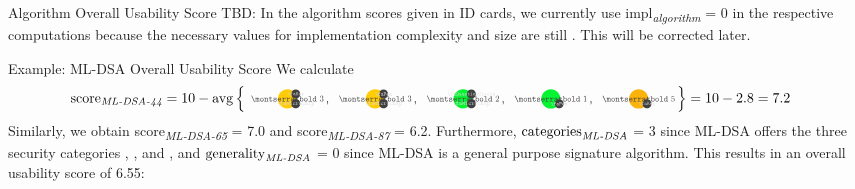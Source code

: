 \begin{algorithmbox}{Algorithm Overall Usability Score}
	\textcolor{themeaccentsecondary}{TBD: In the algorithm scores given in ID cards, we currently use \textnormal{impl\textsubscript{\itshape algorithm}} = 0 in the respective computations because the necessary values for implementation complexity and size are still \tbd. This will be corrected later.}
\end{algorithmbox}
\vspace{-2mm}
\begin{algorithmbox}{Example: ML-DSA Overall Usability Score}
	\tiny
	We calculate
	\vspace{-4mm}
	\begin{align*}
		\textnormal{score\textsubscript{\itshape ML-DSA-44}} &= \textnormal{10} - \avg\left\{{\scriptsize
		\tripleicon{\montserratbold 3}{\faMicrochip}{themeyellow}{0.6}{\faKey}\hspace{-1mm}\textnormal{, } %
		\tripleicon{\montserratbold 3}{\faMicrochip}{themeyellow}{0.6}{\faPen}\hspace{-1mm}\textnormal{, } %
		\tripleicon{\montserratbold 2}{\faMicrochip}{themegreen}{0.6}{\faQuestionCircle}\hspace{-1mm}\textnormal{, } %
		\doubleicon{\montserratbold 1}{\faPen}{themegreen}{0.6}\hspace{-1mm}\textnormal{, } %
		\doubleicon{\montserratbold 5}{\faKey}{themeorange}{0.6}\hspace{-1mm}
		}\right\} = \textnormal{10} - \textnormal{2.8} = \textnormal{7.2}
	\end{align*}
	Similarly, we obtain \textnormal{score\textsubscript{\itshape ML-DSA-65}} = 7.0 and \textnormal{score\textsubscript{\itshape ML-DSA-87}} = 6.2. Furthermore, $\textnormal{categories}_\textnormal{\itshape ML-DSA}$ = 3 since ML-DSA offers the three security categories \hspace{-2mm}, \hspace{-2mm}, and \hspace{-2mm}, and $\textnormal{generality}_\textnormal{\itshape ML-DSA}$ = 0 since ML-DSA is a general purpose signature algorithm. This results in an overall usability score of 6.55:\\[\baselineskip]


\end{algorithmbox}
